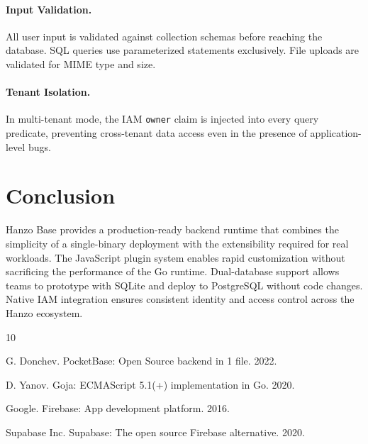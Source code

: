 \documentclass[11pt,twocolumn]{article}
\begin{document}
\paragraph{Input Validation.} All user input is validated against collection schemas before reaching the database. SQL queries use parameterized statements exclusively. File uploads are validated for MIME type and size.

\paragraph{Tenant Isolation.} In multi-tenant mode, the IAM \texttt{owner} claim is injected into every query predicate, preventing cross-tenant data access even in the presence of application-level bugs.

\section{Conclusion}

Hanzo Base provides a production-ready backend runtime that combines the simplicity of a single-binary deployment with the extensibility required for real workloads. The JavaScript plugin system enables rapid customization without sacrificing the performance of the Go runtime. Dual-database support allows teams to prototype with SQLite and deploy to PostgreSQL without code changes. Native IAM integration ensures consistent identity and access control across the Hanzo ecosystem.


\begin{thebibliography}{10}

G. Donchev. PocketBase: Open Source backend in 1 file. 2022.

D. Yanov. Goja: ECMAScript 5.1(+) implementation in Go. 2020.

Google. Firebase: App development platform. 2016.

Supabase Inc. Supabase: The open source Firebase alternative. 2020.

\end{thebibliography}
\end{document}
